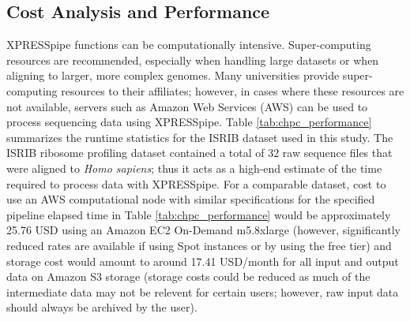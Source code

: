 \documentclass[10pt, oneside]{article}
\begin{document}
\subsection*{Cost Analysis and Performance}
XPRESSpipe functions can be computationally intensive. Super-computing resources are recommended, especially when handling large datasets or when aligning to larger, more complex genomes. Many universities provide super-computing resources to their affiliates; however, in cases where these resources are not available, servers such as Amazon Web Services (AWS) \cite{aws} can be used to process sequencing data using XPRESSpipe. Table \ref{tab:chpc_performance} summarizes the runtime statistics for the ISRIB dataset used in this study. The ISRIB ribosome profiling dataset contained a total of 32 raw sequence files that were aligned to \textit{Homo sapiens}; thus it acts as a high-end estimate of the time required to process data with XPRESSpipe. For a comparable dataset, cost to use an AWS computational node with similar specifications for the specified pipeline elapsed time in Table \ref{tab:chpc_performance} would be approximately 25.76 USD using an Amazon EC2 On-Demand m5.8xlarge (however, significantly reduced rates are available if using Spot instances or by using the free tier) and storage cost would amount to around 17.41 USD/month for all input and output data on Amazon S3 storage (storage costs could be reduced as much of the intermediate data may not be relevent for certain users; however, raw input data should always be archived by the user).\\
\end{document}
